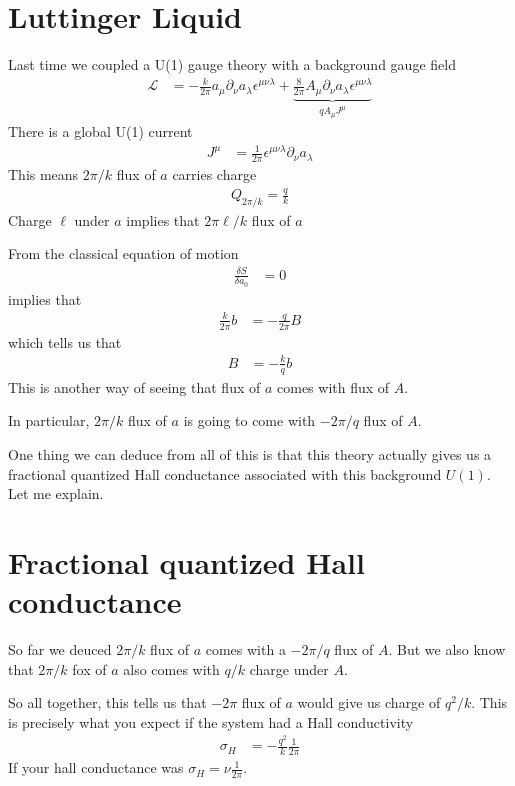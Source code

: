 \section{Luttinger Liquid}
Last time we coupled a U(1) gauge theory with a background gauge field
\begin{align}
    \mathcal{L} &=
    -\frac{k}{2\pi}
    a_\mu \partial_\nu a_\lambda \epsilon^{\mu\nu\lambda}
    +
    \underbrace{
    \frac{8}{2\pi} A_\mu \partial_\nu a_\lambda \epsilon^{\mu\nu\lambda}
    }_{
    q A_\mu J^\mu
    }
\end{align}
There is a global U(1) current
\begin{align}
    J^\mu &=
    \frac{1}{2\pi}
    \epsilon^{\mu\nu\lambda}
    \partial_\nu a_\lambda
\end{align}
This means $2\pi/k$ flux of $a$ carries charge
\begin{align}
    Q_{2\pi/k} = \frac{q}{k}
\end{align}
Charge $\ell$ under $a$ implies that
$2\pi\ell /k$ flux of $a$

From the classical equation of motion
\begin{align}
    \frac{\delta S}{\delta a_0} &= 0
\end{align}
implies that
\begin{align}
    \frac{k}{2\pi}b &=
    -\frac{q}{2\pi}B
\end{align}
which tells us that
\begin{align}
    B &=
    -\frac{k}{q}b
\end{align}
This is another way of seeing that flux of $a$
comes with flux of $A$.

In particular,
$2\pi/k$ flux of $a$ is going to come with
$-2\pi/q$ flux of $A$.

One thing we can deduce from all of this is that this theory actually gives us a
fractional quantized Hall conductance associated with this background $U(1)$.
Let me explain.

\section{Fractional quantized Hall conductance}
So far we deuced $2\pi/k$ flux of $a$
comes with a $-2\pi/q$ flux of $A$.
But we also know that $2\pi/k$ fox of $a$ also comes with
$q/k$ charge under $A$.

So all together,
this tells us that $-2\pi$ flux of $a$
would give us charge of $q^2/k$.
This is precisely what you expect if the system had a Hall conductivity
\begin{align}
    \sigma_H &=
    - \frac{q^2}{k} \frac{1}{2\pi}
\end{align}
If your hall conductance was $\sigma_H = \nu \frac{1}{2\pi}$.

